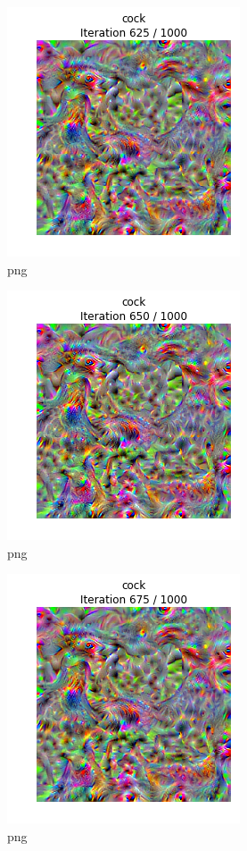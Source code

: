 \documentclass[]{book}
\theoremstyle{definition}
\theoremstyle{definition}
\theoremstyle{definition}
\theoremstyle{remark}
\begin{document}
\begin{figure}
\centering
\includegraphics{Network-Visualization-TensorFlow_files/Network-Visualization-TensorFlow_22_25.png}
\caption{png}
\end{figure}

\begin{figure}
\centering
\includegraphics{Network-Visualization-TensorFlow_files/Network-Visualization-TensorFlow_22_26.png}
\caption{png}
\end{figure}

\begin{figure}
\centering
\includegraphics{Network-Visualization-TensorFlow_files/Network-Visualization-TensorFlow_22_27.png}
\caption{png}
\end{figure}
\end{document}
